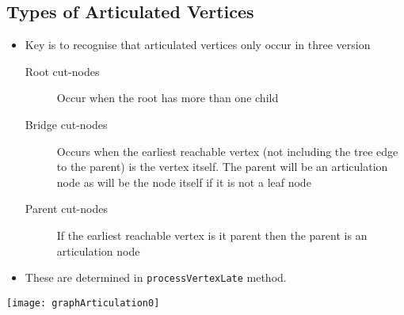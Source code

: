 \begin{slide}
\section[-1]{Types of Articulated Vertices}

\begin{minipage}{0.55\linewidth}
  \begin{PauseHighLight}\small
  \begin{itemize}\squeeze\raggedright
  \item Key is to recognise that articulated vertices only occur in
    three version\pause
    \begin{description}
    \item[Root cut-nodes] Occur when the root has more than one child\pause
    \item[Bridge cut-nodes] Occurs when the earliest reachable vertex
      (not including the tree edge to the parent) is the vertex
      itself. The parent will be an articulation node as will be the
      node itself if it is not a leaf node\pause
    \item[Parent cut-nodes] If the earliest reachable vertex is it
      parent then the parent is an articulation node\pause
    \end{description}
  \item These are determined in \texttt{processVertexLate} method.\pause
  \end{itemize}
\end{PauseHighLight}

\end{minipage}\hfill
\begin{minipage}{0.4\linewidth}
  \texttt{[image: graphArticulation0]}
\end{minipage}
\end{slide}


